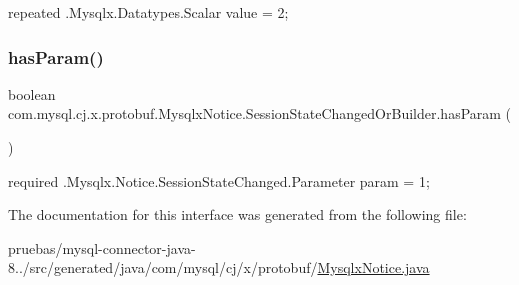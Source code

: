 {\ttfamily repeated .Mysqlx.\+Datatypes.\+Scalar value = 2;} \mbox{\label{interfacecom_1_1mysql_1_1cj_1_1x_1_1protobuf_1_1_mysqlx_notice_1_1_session_state_changed_or_builder_a4487572853d49df81e729383d0412a1b}} 
\subsubsection{\texorpdfstring{has\+Param()}{hasParam()}}
{\footnotesize\ttfamily boolean com.\+mysql.\+cj.\+x.\+protobuf.\+Mysqlx\+Notice.\+Session\+State\+Changed\+Or\+Builder.\+has\+Param (\begin{DoxyParamCaption}{ }\end{DoxyParamCaption})}

{\ttfamily required .Mysqlx.\+Notice.\+Session\+State\+Changed.\+Parameter param = 1;} 

The documentation for this interface was generated from the following file\+:\begin{DoxyCompactItemize}
\item 
pruebas/mysql-\/connector-\/java-\/8../src/generated/java/com/mysql/cj/x/protobuf/\mbox{\hyperlink{_mysqlx_notice_8java}{Mysqlx\+Notice.\+java}}\end{DoxyCompactItemize}
